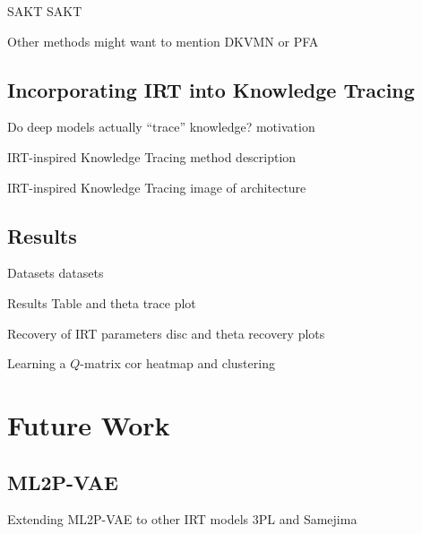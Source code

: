 \documentclass{beamer}
\theoremstyle{definition}
\begin{document}
\begin{frame}{SAKT}
  SAKT
\end{frame}

\begin{frame}{Other methods}
  might want to mention DKVMN or PFA
\end{frame}

\subsection{Incorporating IRT into Knowledge Tracing}
\begin{frame}{Do deep models actually ``trace'' knowledge?}
  motivation
\end{frame}

\begin{frame}{IRT-inspired Knowledge Tracing}
  method description
\end{frame}

\begin{frame}{IRT-inspired Knowledge Tracing}
  image of architecture
\end{frame}

\subsection{Results}
\begin{frame}{Datasets}
  datasets
\end{frame}

\begin{frame}{Results}
  Table and theta trace plot
\end{frame}

\begin{frame}{Recovery of IRT parameters}
  disc and theta recovery plots
\end{frame}

\begin{frame}{Learning a $Q$-matrix}
  cor heatmap and clustering
\end{frame}


\section{Future Work}

\subsection{ML2P-VAE}
\begin{frame}{Extending ML2P-VAE to other IRT models}
  3PL and Samejima
\end{frame}
\end{document}
